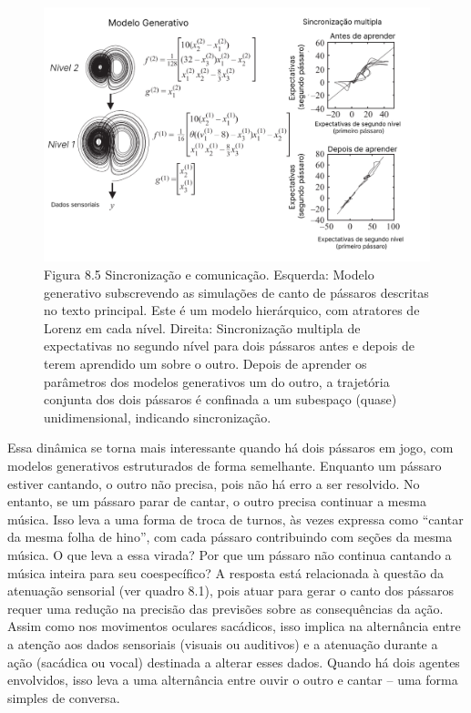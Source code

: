 \documentclass[
  12pt,
]{book}
\begin{document}
\begin{figure}
\centering
\includegraphics{images/Figura_8_5.png}
\caption{Figura 8.5 Sincronização e comunicação. Esquerda: Modelo generativo subscrevendo as simulações de canto de pássaros descritas no texto principal. Este é um modelo hierárquico, com atratores de Lorenz em cada nível. Direita: Sincronização multipla de expectativas no segundo nível para dois pássaros antes e depois de terem aprendido um sobre o outro. Depois de aprender os parâmetros dos modelos generativos um do outro, a trajetória conjunta dos dois pássaros é confinada a um subespaço (quase) unidimensional, indicando sincronização.}
\end{figure}

Essa dinâmica se torna mais interessante quando há dois pássaros em jogo, com modelos generativos estruturados de forma semelhante. Enquanto um pássaro estiver cantando, o outro não precisa, pois não há erro a ser resolvido. No entanto, se um pássaro parar de cantar, o outro precisa continuar a mesma música. Isso leva a uma forma de troca de turnos, às vezes expressa como ``cantar da mesma folha de hino'', com cada pássaro contribuindo com seções da mesma música. O que leva a essa virada? Por que um pássaro não continua cantando a música inteira para seu coespecífico? A resposta está relacionada à questão da atenuação sensorial (ver quadro 8.1), pois atuar para gerar o canto dos pássaros requer uma redução na precisão das previsões sobre as consequências da ação. Assim como nos movimentos oculares sacádicos, isso implica na alternância entre a atenção aos dados sensoriais (visuais ou auditivos) e a atenuação durante a ação (sacádica ou vocal) destinada a alterar esses dados. Quando há dois agentes envolvidos, isso leva a uma alternância entre ouvir o outro e cantar -- uma forma simples de conversa.
\end{document}
